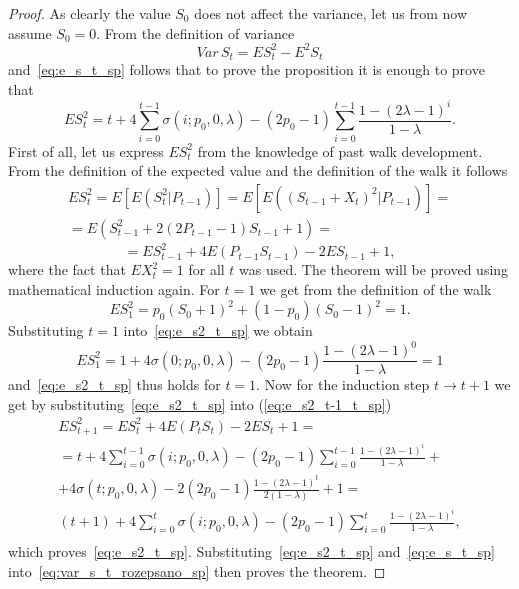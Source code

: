 \documentclass[runningheads]{CMSIM}
\begin{document}
    \begin{proof}
        As clearly the value $S_{0}$ does not affect the variance, let us
        from now assume $S_{0}=0$.
        From the definition of variance
        \begin{equation}
            Var\,S_{t}=ES_{t}^{2}-E^{2}S_{t}\label{eq:var_s_t_rozepsano_sp}
        \end{equation}
        and~\eqref{eq:e_s_t_sp} follows that to prove the proposition it
        is enough to prove that
        \begin{equation}
            ES_{t}^{2}=t+4\sum_{i=0}^{t-1}\sigma(i;p_{0},0,\lambda)-(2p_{0}-1)\sum_{i=0}^{t-1}\frac{1-(2\lambda-1)^{i}}{1-\lambda}.\label{eq:e_s2_t_sp}
        \end{equation}
        First of all, let us express $ES_{t}^{2}$ from the knowledge of past
        walk development.
        From the definition of the expected value and the
        definition of the walk it follows
        \begin{gather*}
            ES_{t}^{2}=E[E(S_{t}^{2}|P_{t-1})]=E[E((S_{t-1}+X_{t})^{2}|P_{t-1})]=\\
            =E(S_{t-1}^{2}+2(2P_{t-1}-1)S_{t-1}+1)=
        \end{gather*}
        \begin{equation}
            =ES_{t-1}^{2}+4E(P_{t-1}S_{t-1})-2ES_{t-1}+1,\label{eq:e_s2_t-1_t_sp}
        \end{equation}
        where the fact that $EX_{t}^{2}=1$ for all $t$ was used.
        The theorem will be proved using mathematical induction again.
        For $t=1$ we get from the definition of the walk
        \[
            ES_{1}^{2}=p_{0}(S_{0}+1)^{2}+(1-p_{0})(S_{0}-1)^{2}=1.
        \]
        Substituting $t=1$ into~\eqref{eq:e_s2_t_sp} we obtain
        \[
            ES_{1}^{2}=1+4\sigma(0;p_{0},0,\lambda)-(2p_{0}-1)\frac{1-(2\lambda-1)^{0}}{1-\lambda}=1
        \]
        and~\eqref{eq:e_s2_t_sp} thus holds for $t=1$.
        Now for the induction
        step $t\rightarrow t+1$ we get by substituting~\eqref{eq:e_s2_t_sp}
        into (\ref{eq:e_s2_t-1_t_sp})
        \begin{gather*}
            ES_{t+1}^{2}=ES_{t}^{2}+4E(P_{t}S_{t})-2ES_{t}+1=\\
            =t+4\sum_{i=0}^{t-1}\sigma(i;p_{0},0,\lambda)-(2p_{0}-1)\sum_{i=0}^{t-1}\frac{1-(2\lambda-1)^{i}}{1-\lambda}+\\
            +4\sigma(t;p_{0},0,\lambda)-2(2p_{0}-1)\frac{1-(2\lambda-1)^{t}}{2(1-\lambda)}+1=\\
            (t+1)+4\sum_{i=0}^{t}\sigma(i;p_{0},0,\lambda)-(2p_{0}-1)\sum_{i=0}^{t}\frac{1-(2\lambda-1)^{i}}{1-\lambda},\\
        \end{gather*}
        which proves~\eqref{eq:e_s2_t_sp}.
        Substituting~\eqref{eq:e_s2_t_sp}
        and~\eqref{eq:e_s_t_sp} into~\eqref{eq:var_s_t_rozepsano_sp} then
        proves the theorem.
    \end{proof}
\end{document}
